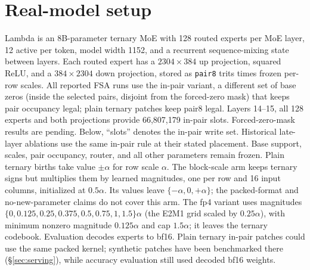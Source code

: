\documentclass[11pt]{article}
\begin{document}
\section{Real-model setup}
\label{sec:real}
Lambda is an 8B-parameter ternary MoE with 128 routed experts per MoE
layer, 12 active per token, model width 1152, and a recurrent sequence-mixing state between layers.
Each routed expert has a $2304\!\times\!384$ up projection, squared ReLU, and a
$384\!\times\!2304$ down projection, stored as \texttt{pair8} trits times frozen per-row scales.
All reported FSA runs use the in-pair variant, a different set of base zeros (inside the selected pairs, disjoint from the forced-zero mask) that keeps pair occupancy legal; plain ternary patches keep pair8 legal. Layers 14--15, all 128 experts and both projections provide 66,807,179 in-pair slots. Forced-zero-mask results are pending. Below, ``slots'' denotes the in-pair write set. Historical late-layer ablations use the same in-pair rule at their stated placement. Base support, scales, pair occupancy, router, and all other parameters
remain frozen. Plain ternary births take value $\pm\alpha$ for row scale $\alpha$. The block-scale
arm keeps ternary signs but multiplies them by learned magnitudes, one per row and 16 input columns,
initialized at $0.5\alpha$. Its values leave $\{-\alpha,0,+\alpha\}$; the packed-format and
no-new-parameter claims do not cover this arm. The fp4 variant uses magnitudes
$\{0,0.125,0.25,0.375,0.5,0.75,1,1.5\}\alpha$ (the E2M1 grid scaled by $0.25\alpha$),
with minimum nonzero magnitude $0.125\alpha$ and cap $1.5\alpha$; it leaves the ternary codebook. Evaluation decodes experts to bf16. Plain ternary in-pair patches could use the same packed
kernel; synthetic patches have been benchmarked there (\S\ref{sec:serving}), while accuracy
evaluation still used decoded bf16 weights.
\end{document}
